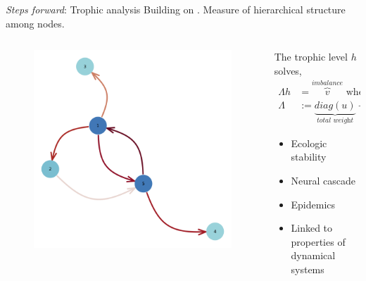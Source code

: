 \documentclass[xcolor={svgnames}]{beamer}
\begin{document}
\begingroup
\begin{frame}{\textit{Steps forward}: Trophic analysis}
    Building on \citeauthor[]{MacKay2020}. Measure of hierarchical structure among nodes.

    \begin{columns}
        \begin{column}{.49\textwidth}
            \begin{figure}
                \includegraphics[width=0.8\linewidth,height=0.8\textheight,keepaspectratio]{../../plots/presentations/lv-network.png}
            \end{figure}
        \end{column}
        \begin{column}{.48\textwidth}
            The trophic level $h$ solves,
            \begin{equation*}
                \begin{split}
                    \Lambda h &= \overbrace{v}^{\textit{imbalance}} \text{ where }\\
                    \Lambda &:= \underbrace{diag(u)}_{\textit{total weight}} - W - W^T
                \end{split}
            \end{equation*}
            \begin{itemize}
                \item Ecologic stability
                \item Neural cascade
                \item Epidemics
                \item Linked to properties of dynamical systems
            \end{itemize}
        \end{column}
    \end{columns}
\end{frame}
\end{document}
